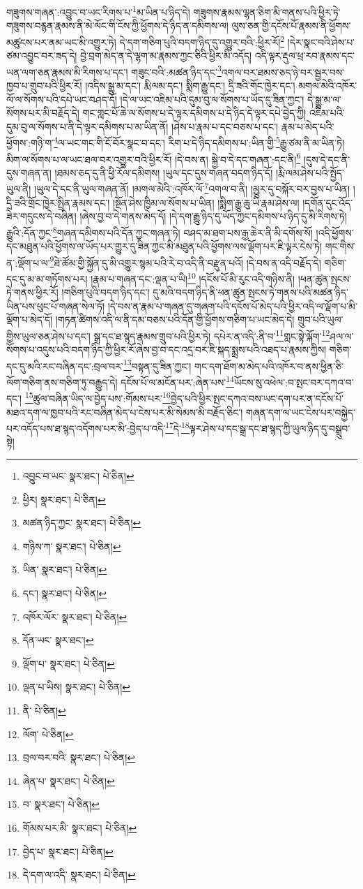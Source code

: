 གཟུགས་གཞན་:འབྱུང་བ་ཡང་རིགས་པ་\footnote{འབྱུང་བ་ཡང་  སྣར་ཐང་།  པེ་ཅིན། }མ་ཡིན་པ་ཉིད་དེ། གཟུགས་རྣམས་ལྷན་ཅིག་མི་གནས་པའི་ཕྱིར་ཏེ་གཟུགས་བརྙན་རྣམས་ནི་མེ་ལོང་གི་ངོས་ཀྱི་ཕྱོགས་དེ་ཉིད་ན་དམིགས་ལ། ལུས་ཅན་གྱི་དངོས་པོ་རྣམས་ནི་ཕྱོགས་མཚུངས་པར་ནམ་ཡང་མི་འགྱུར་ཏེ། དེ་དག་གཅིག་པུའི་བདག་ཉིད་དུ་འགྱུར་བའི་:ཕྱིར་རོ།\footnote{ཕྱིར།  སྣར་ཐང་།  པེ་ཅིན། } །དེར་སྣང་བའི་ཤེས་པ་ཙམ་འབྱུང་བར་ཟད་དེ། བྱེ་བྲག་མེད་ན་དེ་ལྷག་མ་རྣམས་ཀྱང་ཅིའི་ཕྱིར་མི་འདོད། འདི་ལྟར་རྡུལ་ཕྲ་རབ་རྣམས་དང་ཡན་ལག་ཅན་རྣམས་མི་རིགས་པ་དང་། གཟུང་བའི་:མཚན་ཉིད་དང་\footnote{མཚན་ཉིད་ཀྱང་  སྣར་ཐང་།  པེ་ཅིན། }འགལ་བར་ཐམས་ཅད་ཉེ་བར་སྦྱར་བས་ཁྱབ་པ་གྲུབ་པའི་ཕྱིར་རོ། །འདིས་སྒྱུ་མ་དང་། རྨི་ལམ་དང་། སྨིག་རྒྱུ་དང་། དྲི་ཟའི་གོང་ཁྱེར་དང་། མགལ་མེའི་འཁོར་ལོ་ལ་སོགས་པའི་དཔེ་ཡང་བཤད་དོ། །དེ་ལ་ཡང་འཇིམ་པའི་དུམ་བུ་ལ་སོགས་པ་ཡོད་དུ་ཟིན་ཀྱང་། དེ་སྒྱུ་མ་ལ་སོགས་པར་མི་བརྗོད་དེ། གང་གླང་པོ་ཆེ་ལ་སོགས་པ་དེ་ལྟར་དམིགས་པ་དེ་ཉིད་དེ་ལྟར་དཔེ་བྱེད་ཀྱི། འཇིམ་པའི་དུམ་བུ་ལ་སོགས་པ་ནི་དེ་ལྟར་དམིགས་པ་མ་ཡིན་ནོ། །ཤེས་པ་རྣམ་པ་དང་བཅས་པ་དང་། རྣམ་པ་མེད་པའི་ཕྱོགས་:གཉི་ག་\footnote{གཉིས་ཀ་  སྣར་ཐང་།  པེ་ཅིན། }ལ་ཡང་གང་གི་ངོ་བོར་སྣང་བ་དང་། རིག་པ་དེ་ཉིད་དམིགས་པ་:ཡིན་གྱི་\footnote{ཡིན་  སྣར་ཐང་།  པེ་ཅིན། }རྒྱུ་ཙམ་ནི་མ་ཡིན་ཏེ། མིག་ལ་སོགས་པ་ལ་ཡང་ཐལ་བར་འགྱུར་བའི་ཕྱིར་རོ། །དེ་བས་ན། སྐྱེ་བ་དེ་དང་གཞན་:དང་ནི།\footnote{དང་།  སྣར་ཐང་།  པེ་ཅིན། } །དུས་དེ་དང་ནི་དུས་གཞན་ན། །ཐམས་ཅད་དུ་ནི་ཕྱི་རོལ་དམིགས། །ཡུལ་དང་དུས་གཞན་བདག་ཉིད་དོ། །རྨི་ལམ་ཤེས་པའི་སྤྱོད་ཡུལ་ནི། །ཡུལ་དེ་དང་ནི་ཡུལ་གཞན་ནོ། །མགལ་མེའི་:འཁོར་ལོ་\footnote{འཁོར་ལོར་  སྣར་ཐང་།  པེ་ཅིན། }འགལ་བ་ནི། །མྱུར་དུ་བསྐོར་བར་བྱས་པ་ཡིན། །དྲི་ཟའི་གྲོང་ཁྱེར་སྤྲིན་རྣམས་དང་། །སྔོན་ཤེས་ཁྱིམ་ལ་སོགས་པ་ཡིན། །སྨིག་རྒྱུ་ཆུ་ཡི་རྣམ་ཤེས་ལ། །དགོན་དུང་འོད་ཟེར་གདུངས་དེ་བཞིན། །ཞེས་བྱ་བ་དེ་གནས་མེད་དོ། །དེ་དག་རྒྱུ་ཉིད་དུ་ཡོད་ཀྱང་དམིགས་པ་ཉིད་དུ་མི་རིགས་ཏེ། རྒྱུའི་:དོན་ཀྱང་\footnote{དོན་ཡང་  སྣར་ཐང་། }གཞན་དམིགས་པའི་དོན་ཀྱང་གཞན་ཏེ། བཤད་མ་ཐག་པས་རྒྱ་ཆེར་ནི་མི་དགོས་སོ། །འདི་ཕྱོགས་དང་མཐུན་པའི་ཕྱོགས་ལ་ཡོད་པར་གྱུར་དུ་ཟིན་ཀྱང་མི་མཐུན་པའི་ཕྱོགས་ལས་ལྡོག་པར་ཇི་ལྟར་ངེས་ཏེ། གང་གིས་ན་:ལྡོག་པ་ལ་\footnote{ལྡོག་པ་  སྣར་ཐང་།  པེ་ཅིན། }ཐེ་ཚོམ་གྱི་སྐྱོན་དུ་མི་འགྱུར་སྙམ་པའི་རེ་བ་འདི་ནི་བརྫུན་པའོ། །དེ་བས་ན་འདི་བརྗོད་དེ། གཅིག་དང་དུ་མ་མ་གཏོགས་པར། །རྣམ་པ་གཞན་དང་:ལྡན་པ་ཡི།\footnote{ལྡན་པ་ཡིས།  སྣར་ཐང་།  པེ་ཅིན། } །དངོས་པོ་མི་རུང་འདི་གཉིས་ནི། །ཕན་ཚུན་སྤངས་ཏེ་གནས་ཕྱིར་རོ། །གཅིག་པུའི་བདག་ཉིད་དང་། དུ་མའི་བདག་ཉིད་ནི་ཕན་ཚུན་སྤངས་ཏེ་གནས་པའི་མཚན་ཉིད་ཡིན་པས་ཕུང་པོ་གཞན་སེལ་ཏོ། །དེ་བས་ན་རྣམ་པ་གཞན་དུ་གཞག་པའི་དངོས་པོ་མེད་པའི་ཕྱིར་འདི་ལ་ལྡོག་པ་མི་ལྡོག་པ་མེད་དོ། །གཏན་ཚིགས་འདི་ལ་ནི་དམ་བཅས་པའི་དོན་གྱི་ཕྱོགས་གཅིག་པ་ཡང་མེད་དེ། གྲུབ་པའི་ཡུལ་གྱིས་ཡུལ་ཅན་ཤེས་པ་དང་། སྒྲ་དང་ཐ་སྙད་རྣམས་གྲུབ་པའི་ཕྱིར་ཏེ། དཔེར་ན་འདི་:ནི་བ་\footnote{ནི་  པེ་ཅིན། }གླང་སྟེ་ལྐོག་\footnote{ལོག་  པེ་ཅིན། }ཤལ་ལ་སོགས་པ་འདུས་པའི་བདག་ཉིད་ཀྱི་ཕྱིར་རོ་ཞེས་བྱ་བ་དང་འདྲ་བར་ཇི་སྐད་སྨྲས་པའི་འཐད་པ་རྣམས་ཀྱིས། གཅིག་དང་དུ་མའི་རང་བཞིན་དང་:བྲལ་བར་\footnote{བྲལ་བར་བའི་  སྣར་ཐང་།  པེ་ཅིན། }བསྟན་དུ་ཟིན་ཀྱང་། གང་དག་ཐོག་མ་མེད་པའི་འཁོར་བ་ནས་ཕྱིན་ཅི་ལོག་གཅིག་ནས་གཅིག་ཏུ་བརྒྱུད་དེ། དངོས་པོ་ལ་མངོན་པར་:ཞེན་པས་\footnote{ཞེན་པ་  སྣར་ཐང་།  པེ་ཅིན། }ཡོངས་སུ་འཕེལ་:བ་སྤང་བར་དཀའ་བ་དང་། \footnote{བ་  སྣར་ཐང་།  པེ་ཅིན། }ཚུལ་བཞིན་ཡིད་ལ་བྱེད་པས་:གོམས་པར་\footnote{གོམས་པར་མི་  སྣར་ཐང་།  པེ་ཅིན། }བྱེད་པའི་ཕྱིར་སྤང་དཀའ་བས་ཡང་དག་པར་ན་དངོས་པོ་མཐའ་དག་ལ་ཁྱབ་པའི་རང་བཞིན་མེད་པ་ངེས་པར་མི་སེམས་མི་བརྗོད་ཅིང་། གཞན་དག་ལ་ཡང་ངེས་པར་བསྐྱེད་པར་འདོད་པས་ཐ་སྙད་འདོགས་པར་མི་:བྱེད་པ་འདི་\footnote{བྱེད་པ་  སྣར་ཐང་།  པེ་ཅིན། }དེ་\footnote{དེ་དག་ལ་འདི་  སྣར་ཐང་།  པེ་ཅིན། }ལྟར་ཤེས་པ་དང་སྒྲ་དང་ཐ་སྙད་ཀྱི་ཡུལ་ཉིད་དུ་བསྒྲུབ་སྟེ། 
